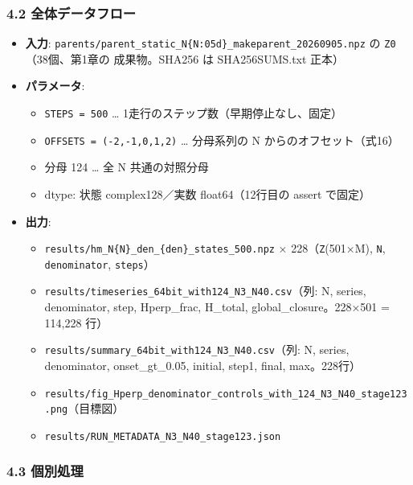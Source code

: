 \documentclass[
  a4paper,
]{ltjsarticle}
\providecommand{\tightlist}{%
  \setlength{\itemsep}{0pt}\setlength{\parskip}{0pt}}
\begin{document}
\subsubsection{4.2
全体データフロー}\label{ux5168ux4f53ux30c7ux30fcux30bfux30d5ux30edux30fc}

\begin{itemize}
\tightlist
\item
  \textbf{入力}:
  \texttt{parents/parent\_static\_N\{N:05d\}\_makeparent\_20260905.npz}
  の \texttt{Z0}（38個、第1章の 成果物。SHA256 は SHA256SUMS.txt 正本）
\item
  \textbf{パラメータ}:

  \begin{itemize}
  \tightlist
  \item
    \texttt{STEPS\ =\ 500} \ldots{}
    1走行のステップ数（早期停止なし、固定）
  \item
    \texttt{OFFSETS\ =\ (-2,-1,0,1,2)} \ldots{} 分母系列の N
    からのオフセット（式16）
  \item
    分母 124 \ldots{} 全 N 共通の対照分母
  \item
    dtype: 状態 complex128／実数 float64（12行目の assert で固定）
  \end{itemize}
\item
  \textbf{出力}:

  \begin{itemize}
  \tightlist
  \item
    \texttt{results/hm\_N\{N\}\_den\_\{den\}\_states\_500.npz} ×
    228（\texttt{Z}(501×M), \texttt{N}, \texttt{denominator},
    \texttt{steps}）
  \item
    \texttt{results/timeseries\_64bit\_with124\_N3\_N40.csv}（列: N,
    series, denominator, step, Hperp\_frac, H\_total,
    global\_closure。228×501 = 114,228 行）
  \item
    \texttt{results/summary\_64bit\_with124\_N3\_N40.csv}（列: N,
    series, denominator, onset\_gt\_0.05, initial, step1, final,
    max。228行）
  \item
    \texttt{results/fig\_Hperp\_denominator\_controls\_with\_124\_N3\_N40\_stage123.png}（目標図）
  \item
    \texttt{results/RUN\_METADATA\_N3\_N40\_stage123.json}
  \end{itemize}
\end{itemize}

\subsubsection{4.3 個別処理}\label{ux500bux5225ux51e6ux7406}
\end{document}
